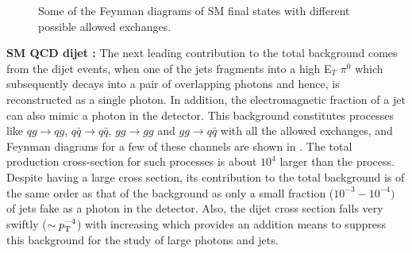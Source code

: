 \begin{figure}[h!]
\centering
 \hspace{1cm}
 \hspace{1cm}
 \caption{Some of the Feynman diagrams of SM \gamjet final states with different possible allowed exchanges.}
\label{fig:qstarBkggj}
\end{figure}

{\bf SM QCD dijet : } The next leading contribution to the total background comes from the dijet events, when one of the jets fragments into a 
high E$_T$ $\pi^0$ which subsequently decays into a pair of overlapping photons and hence, is reconstructed as a single photon. In addition, the
 electromagnetic fraction of a jet can also mimic a photon in the detector. This background constitutes processes like $qg\rightarrow qg$,  
$q\bar{q}\rightarrow q\bar{q}$, $gg\rightarrow gg$ and $gg\rightarrow q\bar{q}$ with all the allowed exchanges, and Feynman diagrams for a few 
of these channels are shown in \fig{\ref{fig:qstarBkgjj}}. The total production cross-section for such processes is about $10^4$ larger 
than the \gamjet process.
Despite having a large cross section, its contribution to the total background is of the same order as that of the \gamjet background
as only a small fraction ($10^{-3}-10^{-4})$ of jets fake as a photon in the detector. Also, the dijet cross section falls very swiftly 
($\sim p_{\mathrm T}^{\mathrm{-4}}$) with increasing  which provides an addition means to suppress this background for the study of large \pt photons and jets.

